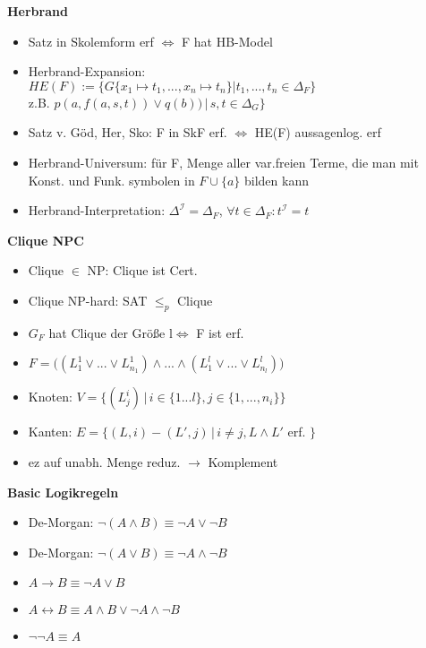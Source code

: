\documentclass[12pt,a4paper]{article}
\begin{document}
\newpage
\begin{paracol}{3}
\switchcolumn[0]
\centering
\textbf{Herbrand}
\flushleft
\begin{itemize}
\setlength\itemsep{-0.5em}
\item Satz in Skolemform erf $\Leftrightarrow$ F hat HB-Model
\item Herbrand-Expansion:\\$HE(F) := \{G\{x_1\mapsto t_1, ..., x_n\mapsto t_n\}|t_1,...,t_n\in\Delta_F\}$\\z.B. $p(a,f(a,s,t))\lor q(b)) \,|\, s,t \in \Delta_G\}$
\item Satz v. Göd, Her, Sko: F in SkF erf. $\Leftrightarrow$ HE(F) aussagenlog. erf
\item Herbrand-Universum: für F, Menge aller var.freien Terme, die man mit Konst. und Funk. symbolen in $F \cup \{a\}$ bilden kann
\item Herbrand-Interpretation: $\Delta^\mathcal{I} = \Delta_F$, $\forall t\in \Delta_F: t^\mathcal{I}=t$
\end{itemize}
\switchcolumn[1]
\centering
\textbf{Clique NPC}
\flushleft
\begin{itemize}
\setlength\itemsep{-0.5em}
\item Clique $\in$ NP: Clique ist Cert.
\item Clique NP-hard: SAT $\leq_p$ Clique
\item $G_F$ hat Clique der Größe l$\Leftrightarrow$ F ist erf.
\item $F = \big( (L_1^1\lor...\lor L_{n_1}^1)\land ...\land (L_1^l\lor ...\lor L_{n_l}^l)\big)$
\item Knoten: $V = \{(L_j^i)\,|\, i\in \{1...l\},j\in\{1,...,n_i\}\}$
\item Kanten: $E = \{(L,i)-(L',j) \,|\, i\neq j, L\land L' $ erf. $\}$
\item ez auf unabh. Menge reduz. $\rightarrow$ Komplement
\end{itemize}
\switchcolumn[2]
\centering
\textbf{Basic Logikregeln}
\flushleft
\begin{itemize}
\setlength\itemsep{-0.5em}
\item De-Morgan: $\neg (A \land  B) \equiv \neg A \lor \neg B$
\item De-Morgan: $\neg (A \lor B) \equiv \neg A \land \neg B$
\item $A \rightarrow B \equiv \neg A \lor B$
\item $A \leftrightarrow B \equiv A \land B \lor \neg A \land \neg B$
\item $\neg \neg A \equiv A$

\end{itemize}
\end{paracol}
\end{document}
